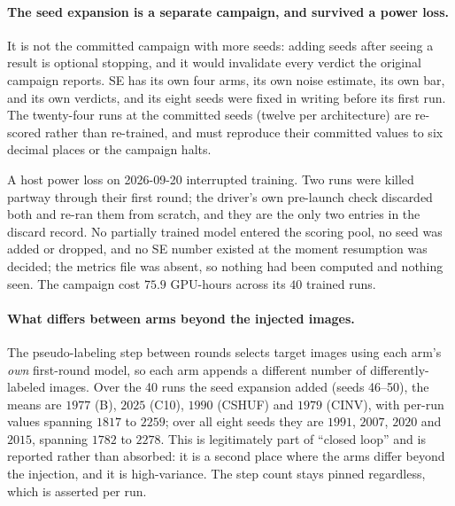 \documentclass{article}
\begin{document}
\paragraph{The seed expansion is a separate campaign, and survived a power loss.} It is not the
committed campaign with more seeds: adding seeds after seeing a result is optional stopping, and it
would invalidate every verdict the original campaign reports. SE has its own four arms, its own
noise estimate, its own bar, and its own verdicts, and its eight seeds were fixed in writing before
its first run. The twenty-four runs at the committed seeds (twelve per architecture) are re-scored rather than re-trained, and must
reproduce their committed values to six decimal places or the campaign halts.

A host power loss on 2026-09-20 interrupted training. Two runs were killed partway through their
first round; the driver's own pre-launch check discarded both and re-ran them from scratch, and they
are the only two entries in the discard record. No partially trained model entered the scoring pool,
no seed was added or dropped, and no SE number existed at the moment resumption was decided; the
metrics file was absent, so nothing had been computed and nothing seen. The campaign cost $75.9$
GPU-hours across its $40$ trained runs.

\paragraph{What differs between arms beyond the injected images.} The pseudo-labeling step between
rounds selects target images using each arm's \emph{own} first-round model, so each arm appends a
different number of differently-labeled images. Over the 40 runs the seed expansion added (seeds 46--50), the means
are $1977$ (B), $2025$ (C10), $1990$ (CSHUF) and $1979$ (CINV), with per-run values spanning $1817$ to $2259$; over all
eight seeds they are $1991$, $2007$, $2020$ and $2015$, spanning $1782$ to $2278$. This
is legitimately part of ``closed loop'' and is reported rather than absorbed: it is a second place where the arms differ beyond the injection, and it is high-variance. The step count stays pinned
regardless, which is asserted per run.
\end{document}
